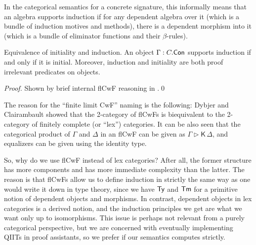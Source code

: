\documentclass{llncs}
\newcommand{\ext}{\triangleright}
\newcommand{\Kfam}{\mathsf{K}}
\begin{document}
In the categorical semantics for a concrete signature, this informally means
that an algebra supports induction if for any dependent algebra over it (which
is a bundle of induction motives and methods), there is a dependent morphism
into it (which is a bundle of eliminator functions and their $\beta$-rules).

\begin{theorem}{Equivalence of initiality and induction.}
An object $\Gamma : C.\mathsf{Con}$ supports induction if and only if it is
initial. Moreover, induction and initiality are both proof irrelevant
predicates on objects.
\end{theorem}
\begin{proof} Shown by brief internal flCwF reasoning in \cite{TODO}.\qed
\end{proof}

The reason for the ``finite limit CwF'' naming is the following: Dybjer and
Clairambault showed\cite{TODO} that the 2-category of flCwFs is biequivalent to
the 2-category of finitely complete (or ``lex'') categories. It can be also seen
that the categorical product of $\Gamma$ and $\Delta$ in an flCwF can be given
as $\Gamma \ext \Kfam\, \Delta$, and equalizers can be given using the identity
type.

So, why do we use flCwF instead of lex categories? After all, the former
structure has more components and has more immediate complexity than the
latter. The reason is that flCwFs allow us to define induction in strictly the
same way as one would write it down in type theory, since we have $\mathsf{Ty}$ and
$\mathsf{Tm}$ for a primitive notion of dependent objects and morphisms. In contrast,
dependent objects in lex categories is a derived notion, and the induction
principles we get are what we want only up to isomorphisms. This issue is
perhaps not relevant from a purely categorical perspective, but we are concerned
with eventually implementing QIITs in proof assistants, so we prefer if our
semantics computes strictly.
\end{document}
